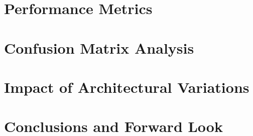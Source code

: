 \section{Performance Metrics}
\section{Confusion Matrix Analysis}
\section{Impact of Architectural Variations}
\section{Conclusions and Forward Look}
